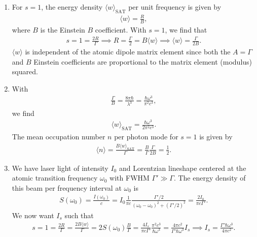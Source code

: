 \documentclass{article}
\theoremstyle{definition}
\newcommand{\f}[2]{\frac{#1}{#2}}
\begin{document}
\begin{enumerate}[label=(\alph*)]
	\item For $s=1$, the energy density $\langle w\rangle_\text{SAT}$ per unit frequency is given by 
	\begin{align*}
	\langle w \rangle =   \f{R}{B}, 
	\end{align*}
	where $B$ is the Einstein $B$ coefficient. With $s=1$, we find that
	\begin{align*}
	s = 1 = \f{2R}{\Gamma} \implies R = \f{\Gamma}{2} = B \langle w \rangle \implies \langle w \rangle = \f{\Gamma}{2B}. 
	\end{align*}
	$\langle w \rangle$ is independent of the atomic dipole matrix element since both the $A=\Gamma$ and $B$ Einstein coefficients are proportional to the matrix element (modulus) squared. 
	
	
	
	
	
	\item With 
	\begin{align*}
	\f{\Gamma}{B} = \f{8\pi \hbar }{\lambda^3} = \f{\hbar \omega^3}{\pi^2 c^3},
	\end{align*}
	we find 
	\begin{align*}
	\langle w \rangle_\text{SAT} =  \f{\hbar \omega^3}{2\pi^2 c^3}.
	\end{align*} 
	The mean occupation number $n$ per photon mode for $s=1$ is given by 
	\begin{align*}
	\langle n \rangle = \f{B\langle w \rangle_\text{SAT}}{\Gamma} = \f{B}{\Gamma} \f{\Gamma}{2B} = \f{1}{2}.   
	\end{align*}
	
	
	
	\item We have laser light of intensity $I_0$ and Lorentzian lineshape centered at the atomic transition frequency $\omega_0$ with FWHM $\Gamma'\gg \Gamma$. The energy density of this beam per frequency interval at $\omega_0$ is 
	\begin{align*}
	S(\omega_0) = \f{I(\omega_0)}{c} = I_0 \f{1}{\pi c} \f{\Gamma'/2}{(\omega_0 - \omega_0)^2 + (\Gamma'/2)^2} = \f{2I_0}{\pi c\Gamma'}.
	\end{align*}
	We now want $I_s$ such that
	\begin{align*}
	s = 1 = \f{2R}{\Gamma} = \f{2B\langle w \rangle}{\Gamma} = 2S(\omega_0) \f{B}{\Gamma} = \f{4I_s}{\pi c\Gamma'} \f{\pi^2 c^3}{\hbar\omega^3} = \f{4\pi c^2}{\Gamma'\hbar \omega^3}I_s \implies I_s = \f{\Gamma' \hbar \omega^3}{4\pi c^2}.
	\end{align*}
	

\end{enumerate}
\end{document}
